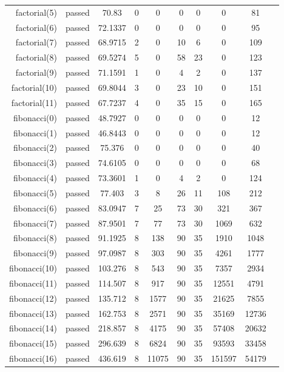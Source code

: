 \begin{longtable}{r|ccccccccc}
    factorial(5) & passed & 70.83 & 0 & 0 & 0 & 0 & 0 & 81 \\
    factorial(6) & passed & 72.1337 & 0 & 0 & 0 & 0 & 0 & 95 \\
    factorial(7) & passed & 68.9715 & 2 & 0 & 10 & 6 & 0 & 109 \\
    factorial(8) & passed & 69.5274 & 5 & 0 & 58 & 23 & 0 & 123 \\
    factorial(9) & passed & 71.1591 & 1 & 0 & 4 & 2 & 0 & 137 \\
    factorial(10) & passed & 69.8044 & 3 & 0 & 23 & 10 & 0 & 151 \\
    factorial(11) & passed & 67.7237 & 4 & 0 & 35 & 15 & 0 & 165 \\
    fibonacci(0) & passed & 48.7927 & 0 & 0 & 0 & 0 & 0 & 12 \\
    fibonacci(1) & passed & 46.8443 & 0 & 0 & 0 & 0 & 0 & 12 \\
    fibonacci(2) & passed & 75.376 & 0 & 0 & 0 & 0 & 0 & 40 \\
    fibonacci(3) & passed & 74.6105 & 0 & 0 & 0 & 0 & 0 & 68 \\
    fibonacci(4) & passed & 73.3601 & 1 & 0 & 4 & 2 & 0 & 124 \\
    fibonacci(5) & passed & 77.403 & 3 & 8 & 26 & 11 & 108 & 212 \\
    fibonacci(6) & passed & 83.0947 & 7 & 25 & 73 & 30 & 321 & 367 \\
    fibonacci(7) & passed & 87.9501 & 7 & 77 & 73 & 30 & 1069 & 632 \\
    fibonacci(8) & passed & 91.1925 & 8 & 138 & 90 & 35 & 1910 & 1048 \\
    fibonacci(9) & passed & 97.0987 & 8 & 303 & 90 & 35 & 4261 & 1777 \\
    fibonacci(10) & passed & 103.276 & 8 & 543 & 90 & 35 & 7357 & 2934 \\
    fibonacci(11) & passed & 114.507 & 8 & 917 & 90 & 35 & 12551 & 4791 \\
    fibonacci(12) & passed & 135.712 & 8 & 1577 & 90 & 35 & 21625 & 7855 \\
    fibonacci(13) & passed & 162.753 & 8 & 2571 & 90 & 35 & 35169 & 12736 \\
    fibonacci(14) & passed & 218.857 & 8 & 4175 & 90 & 35 & 57408 & 20632 \\
    fibonacci(15) & passed & 296.639 & 8 & 6824 & 90 & 35 & 93593 & 33458 \\
    fibonacci(16) & passed & 436.619 & 8 & 11075 & 90 & 35 & 151597 & 54179 \\

\end{longtable}
